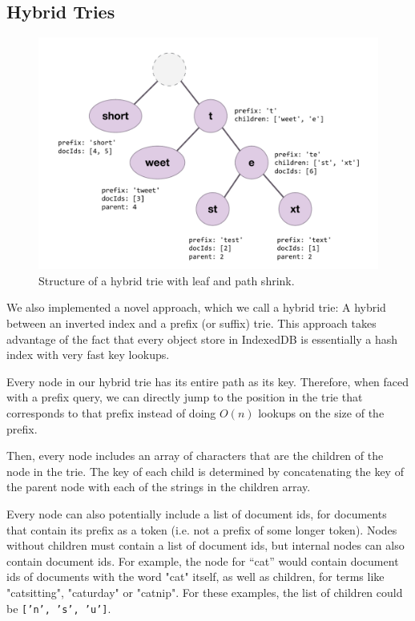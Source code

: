 \documentclass{vldb}
\begin{document}
\subsection{Hybrid Tries}

\begin{figure}[h!]
  \centering
   \includegraphics[scale=.4]{hybrid-trie}
  \caption{Structure of a hybrid trie with leaf and path shrink.}
\end{figure}

We also implemented a novel approach, which we call a hybrid trie: A hybrid between an inverted index and a prefix (or suffix) trie. This approach takes advantage of the fact that every object store in IndexedDB is essentially a hash index with very fast key lookups. 

Every node in our hybrid trie has its entire path as its key. Therefore, when faced with a prefix query, we can directly jump to the position in the trie that corresponds to that prefix instead of doing \(O(n)\) lookups on the size of the prefix.

Then, every node includes an array of characters that are the children of the node in the trie. The key of each child is determined by concatenating the key of the parent node with each of the strings in the children array.

Every node can also potentially include a list of document ids, for documents that contain its prefix as a token (i.e. not a prefix of some longer token). Nodes without children must contain a list of document ids, but internal nodes can also contain document ids. For example, the node for “cat” would contain document ids of documents with the word "cat" itself, as well as children, for terms like "catsitting", "caturday" or "catnip". For these examples, the list of children could be \texttt{['n', 's', 'u']}.
\end{document}
